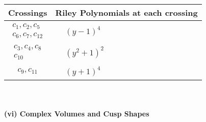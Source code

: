 \documentclass[1p]{elsarticle_modified}
\theoremstyle{definition}
\begin{document}
\begin{tabular}{m{50pt}|m{274pt}}
Crossings & \hspace{64pt}Riley Polynomials at each crossing \\
\hline $$\begin{aligned}c_{1},c_{2},c_{5}\\c_{6},c_{7},c_{12}\end{aligned}$$&$\begin{aligned}
&(y-1)^4
\end{aligned}$\\
\hline $$\begin{aligned}c_{3},c_{4},c_{8}\\c_{10}\end{aligned}$$&$\begin{aligned}
&(y^2+1)^2
\end{aligned}$\\
\hline $$\begin{aligned}c_{9},c_{11}\end{aligned}$$&$\begin{aligned}
&(y+1)^4
\end{aligned}$\\
\hline
\end{tabular}\\~\\
\newpage\flushleft \textbf{(vi) Complex Volumes and Cusp Shapes}
\end{document}
